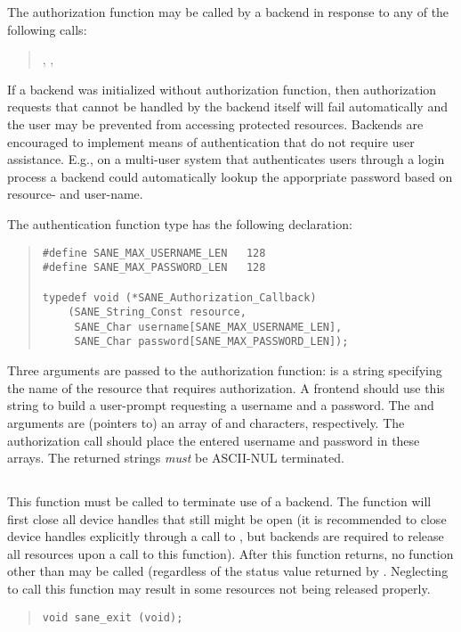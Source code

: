 \documentclass[11pt,DVIps]{report}
\begin{document}
The authorization function may be called by a backend in response to
any of the following calls:
\begin{quote}
  , , 
\end{quote}
If a backend was initialized without authorization function, then
authorization requests that cannot be handled by the backend itself
will fail automatically and the user may be prevented from accessing
protected resources.  Backends are encouraged to implement means of
authentication that do not require user assistance.  E.g., on a
multi-user system that authenticates users through a login process a
backend could automatically lookup the apporpriate password based on
resource- and user-name.

The authentication function type has the following declaration:
\begin{quote}
\begin{verbatim}
#define SANE_MAX_USERNAME_LEN   128
#define SANE_MAX_PASSWORD_LEN   128

typedef void (*SANE_Authorization_Callback)
    (SANE_String_Const resource,
     SANE_Char username[SANE_MAX_USERNAME_LEN],
     SANE_Char password[SANE_MAX_PASSWORD_LEN]);
\end{verbatim}
\end{quote}
Three arguments are passed to the authorization function:
 is a string specifying the name of the resource that
requires authorization.  A frontend should use this string to build a
user-prompt requesting a username and a password.  The 
and  arguments are (pointers to) an array of
 and 
characters, respectively.  The authorization call should place the
entered username and password in these arrays.  The returned strings
{\em must\/} be ASCII-NUL terminated.

\subsection{}

This function must be called to terminate use of a backend.  The
function will first close all device handles that still might be open
(it is recommended to close device handles explicitly through a call
to , but backends are required to release all
resources upon a call to this function).  After this function returns,
no function other than  may be called (regardless
of the status value returned by .  Neglecting to
call this function may result in some resources not being released
properly.
\begin{quote}
\begin{verbatim}
void sane_exit (void);
\end{verbatim}
\end{quote}
\end{document}
